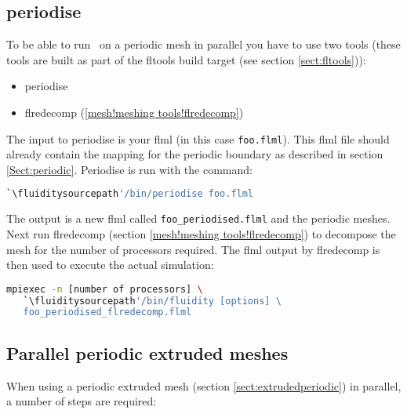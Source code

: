 \subsection{periodise}

To be able to run \fluidity\ on a periodic mesh in parallel you have to use
two tools (these tools are built as part of the fltools build target (see
section \ref{sect:fltools})):

\begin{itemize}
\item periodise
\item flredecomp (\ref{mesh!meshing tools!flredecomp})
\end{itemize}

The input to periodise is your flml (in this case
\lstinline{foo.flml}). This flml file should already contain the mapping for
the periodic boundary as described in section
\ref{Sect:periodic}. Periodise is run with the command:

\begin{lstlisting}[language=bash]
`\fluiditysourcepath'/bin/periodise foo.flml
\end{lstlisting}

The output is a new flml called \lstinline+foo_periodised.flml+ and the
periodic meshes. Next run flredecomp (section \ref{mesh!meshing
  tools!flredecomp}) to decompose the mesh for the number of processors
required. The flml output by flredecomp is then used to execute the actual simulation:

\begin{lstlisting}[language=bash]
mpiexec -n [number of processors] \
   `\fluiditysourcepath'/bin/fluidity [options] \
   foo_periodised_flredecomp.flml
\end{lstlisting}

\subsection{Parallel periodic extruded meshes}
When using a periodic extruded mesh (section \ref{sect:extrudedperiodic}) in parallel, a number
of steps are required:


